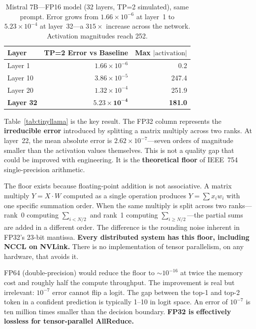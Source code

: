 \documentclass[10pt,twocolumn]{article}
\begin{document}
\begin{table}[t]
\centering
\caption{Mistral 7B---FP16 model (32 layers, TP=2 simulated), same prompt.
Error grows from $1.66\!\times\!10^{-6}$ at layer~1 to
$5.23\!\times\!10^{-4}$ at layer~32---a $315\times$ increase across the
network.  Activation magnitudes reach 252.}
\label{tab:mistral-precision}
\smallskip
\begin{tabular}{@{}lrr@{}}
\toprule
Layer & TP=2 Error vs Baseline & Max $|\text{activation}|$ \\
\midrule
Layer 1  & $1.66\!\times\!10^{-6}$ & 0.2 \\
Layer 10 & $3.86\!\times\!10^{-5}$ & 247.4 \\
Layer 20 & $1.32\!\times\!10^{-4}$ & 251.9 \\
\textbf{Layer 32} & $\mathbf{5.23\!\times\!10^{-4}}$ & \textbf{181.0} \\
\bottomrule
\end{tabular}
\end{table}

Table~\ref{tab:tinyllama} is the key result.  The FP32 column represents
the \textbf{irreducible error} introduced by splitting a matrix multiply
across two ranks.  At layer~22, the mean absolute error is
$2.62\!\times\!10^{-7}$---seven orders of magnitude smaller than the
activation values themselves.  This is not a quality gap that could be
improved with engineering.  It is the \textbf{theoretical floor} of
IEEE~754 single-precision arithmetic.

The floor exists because floating-point addition is not associative.  A
matrix multiply $Y = X \cdot W$ computed as a single operation produces
$Y = \sum x_i w_i$ with one specific summation order.  When the same
multiply is split across two ranks---rank~0 computing $\sum_{i<N/2}$ and
rank~1 computing $\sum_{i \ge N/2}$---the partial sums are added in a
different order.  The difference is the rounding noise inherent in FP32's
23-bit mantissa.  \textbf{Every distributed system has this floor,
including NCCL on NVLink.}  There is no implementation of tensor
parallelism, on any hardware, that avoids it.

FP64 (double-precision) would reduce the floor to $\sim$\!$10^{-16}$ at
twice the memory cost and roughly half the compute throughput.  The
improvement is real but irrelevant: $10^{-7}$ error cannot flip a logit.
The gap between the top-1 and top-2 token in a confident prediction is
typically 1--10 in logit space.  An error of $10^{-7}$ is ten million
times smaller than the decision boundary.  \textbf{FP32 is effectively
lossless for tensor-parallel AllReduce.}
\end{document}

